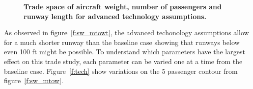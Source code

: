 \documentclass[]{aiaa-tc}%
\begin{document}
\begin{figure}[h!]
 \begin{subfigmatrix}{2}%
 \end{subfigmatrix}
    \caption{\textbf{Trade space of aircraft weight, number of passengers and runway length for advanced technology assumptions.}}
 \label{f:sw_mtt}
\end{figure}

As observed in figure~\ref{f:sw_mtowt}, the advanced techonology assumptions allow for a much shorter runway than the baseline case showing that runways below even 100 ft might be possible. 
To understand which parameters have the largest effect on this trade study, each parameter can be varied one at a time from the baseline case. 
Figure~\ref{f:tech} show variations on the 5 passenger contour from figure~\ref{f:sw_mtow}. 
\end{document}
